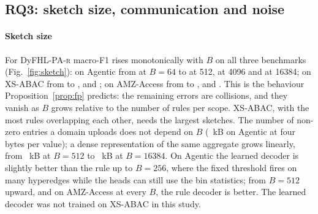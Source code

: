 \documentclass[preprint,12pt]{elsarticle}
\theoremstyle{definition}
\newcommand{\name}{DyFHL-PA\xspace}
\newcommand{\R}{\textsc{r}}
\begin{document}
\begin{table}[t]
\caption{Learning ablation of \name-L ($B=512$): macro-F1 per benchmark (mean $\pm$ std, three seeds) and F1 per task averaged over the two benchmarks.}
\label{tab:abl_l}
\centering\scriptsize
\setlength{\tabcolsep}{3pt}
\end{table}

\subsection{RQ3: sketch size, communication and noise}
\label{sec:sketch}
\paragraph{Sketch size} For \name-\R{} macro-F1 rises monotonically with $B$ on all three benchmarks (Fig.~\ref{fig:sketch}): on Agentic from \skagenticruleBlxiv{} at $B=64$ to \skagenticruleBdxii{} at 512, \skagenticruleBmmmmxcvi{} at 4096 and \skagenticruleBsixteenk{} at 16384; on XS-ABAC from \skxustollerruleBlxiv{} to \skxustollerruleBdxii, \skxustollerruleBmmmmxcvi{} and \skxustollerruleBsixteenk; on AMZ-Access from \skamazonruleBlxiv{} to \skamazonruleBdxii, \skamazonruleBmmmmxcvi{} and \skamazonruleBsixteenk. This is the behaviour Proposition~\ref{prop:fp} predicts: the remaining errors are collisions, and they vanish as $B$ grows relative to the number of rules per scope. XS-ABAC, with the most rules overlapping each other, needs the largest sketches. The number of non-zero entries a domain uploads does not depend on $B$ (\skagenticbytesBdxii~kB on Agentic at four bytes per value); a dense representation of the same aggregate grows linearly, from \skagenticdensekBdxii~kB at $B=512$ to \skagenticdensekBsixteenk~kB at $B=16384$. On Agentic the learned decoder is slightly better than the rule up to $B=256$, where the fixed threshold fires on many hyperedges while the heads can still use the bin statistics; from $B=512$ upward, and on AMZ-Access at every $B$, the rule decoder is better. The learned decoder was not trained on XS-ABAC in this study.
\end{document}
